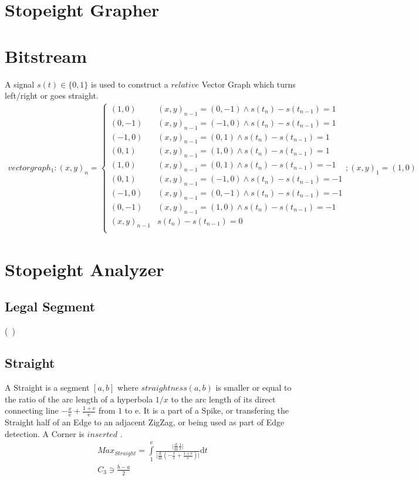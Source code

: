 \documentclass{report}
\begin{document}
\section{Stopeight Grapher}

\section{Bitstream}
A signal $s(t)\in\{0,1\}$ is used to construct a $relative$ Vector Graph which turns left/right or goes straight.
\begin{align}
vectorgraph_{1}: (x,y)_{n}=
\begin{cases}
(1,0) & (x,y)_{n-1}= (0,-1)\land s(t_{n})-s(t_{n-1})=1\\
(0,-1) & (x,y)_{n-1}= (-1,0)\land s(t_{n})-s(t_{n-1})=1\\
(-1,0) & (x,y)_{n-1}= (0,1)\land s(t_{n})-s(t_{n-1})=1\\
(0,1) & (x,y)_{n-1}= (1,0)\land s(t_{n})-s(t_{n-1})=1\\
(1,0) & (x,y)_{n-1}= (0,1)\land s(t_{n})-s(t_{n-1})=-1\\
(0,1) & (x,y)_{n-1}= (-1,0)\land s(t_{n})-s(t_{n-1})=-1\\
(-1,0) & (x,y)_{n-1}= (0,-1)\land s(t_{n})-s(t_{n-1})=-1\\
(0,-1) & (x,y)_{n-1}= (1,0)\land s(t_{n})-s(t_{n-1})=-1\\
(x,y)_{n-1} & s(t_{n})-s(t_{n-1})=0\\
\end{cases};(x,y)_{1}=(1,0)
\end{align}

\section{Stopeight Analyzer}

\subsection{Legal Segment}
(~\cite[Riemann Integrable?]{Widon})

\subsection{Straight}
A Straight is a segment $[a,b]$ where $straightness(a,b)$ is smaller or equal to the ratio of the arc length of a hyperbola $1/x$ to the arc length of its direct connecting line $-\frac{x}{\mathrm{e}}+\frac{1+\mathrm{e}}{\mathrm{e}}$ from $1$ to $\mathrm{e}$. It is a part of a Spike, or transfering the Straight half of an Edge to an adjacent ZigZag, or being used as part of Edge detection. A Corner is $inserted$ .
\begin{align}
Max_{Straight}=\int \limits _{1}^{\mathrm{e}}\frac{\lvert\frac{\mathrm{d}}{\mathrm{d}t}\frac{1}{x}\rvert}{\lvert\frac{\mathrm{d}}{\mathrm{d}t}(-\frac{x}{\mathrm{e}}+\frac{1+\mathrm{e}}{\mathrm{e}})\rvert}\mathrm{d}t\\
C_{3} \ni \frac{b-a}{2}
\end{align}
\end{document}
